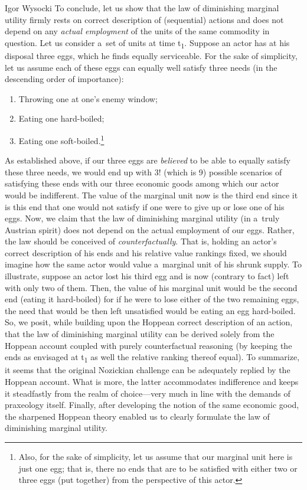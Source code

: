 \begin{artengenv}{Igor Wysocki}
To conclude, let us show that the law of diminishing marginal utility firmly rests on correct description of (sequential) actions and does not depend on any \textit{actual employment} of the units of the same commodity in question. Let us consider a~set of units at time t\textsubscript{1}. Suppose an actor has at his disposal three eggs, which he finds equally serviceable. For the sake of simplicity, let us assume each of these eggs can equally well satisfy three needs (in the descending order of importance):

\begin{enumerate}
\item Throwing one at one's enemy window;
\item Eating one hard-boiled;
\item Eating one soft-boiled.\footnote{Also, for the sake of simplicity, let us assume that our marginal unit here is just one egg; that is, there no ends that are to be satisfied with either two or three eggs (put together) from the perspective of this actor. }
\end{enumerate}
As established above, if our three eggs are \textit{believed} to be able to equally satisfy these three needs, we would end up with 3! (which is 9) possible scenarios of satisfying these ends with our three economic goods among which our actor would be indifferent. The value of the marginal unit now is the third end since it is this end that one would not satisfy if one were to give up or lose one of his eggs. Now, we claim that the law of diminishing marginal utility (in a~truly Austrian spirit) does not depend on the actual employment of our eggs. Rather, the law should be conceived of \textit{counterfactually}. That is, holding an actor's correct description of his ends and his relative value rankings fixed, we should imagine how the same actor would value a~marginal unit of his shrunk supply. To illustrate, suppose an actor lost his third egg and is now (contrary to fact) left with only two of them. Then, the value of his marginal unit would be the second end (eating it hard-boiled) for if he were to lose either of the two remaining eggs, the need that would be then left unsatisfied would be eating an egg hard-boiled. So, we posit, while building upon the Hoppean correct description of an action, that the law of diminishing marginal utility can be derived solely from the Hoppean account coupled with purely counterfactual reasoning (by keeping the ends as envisaged at t\textsubscript{1} as well the relative ranking thereof equal). To summarize, it seems that the original Nozickian challenge can be adequately replied by the Hoppean account. What is more, the latter accommodates indifference and keeps it steadfastly from the realm of choice---very much in line with the demands of praxeology itself. Finally, after developing the notion of the same economic good, the sharpened Hoppean theory enabled us to clearly formulate the law of diminishing marginal utility.


\end{artengenv}
